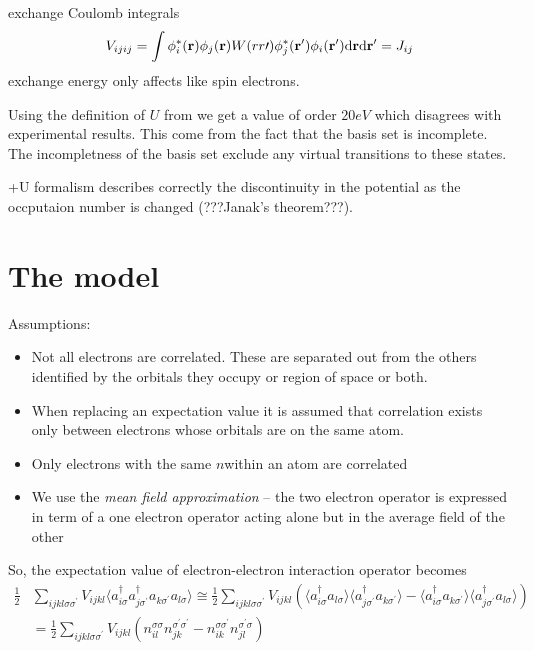 exchange Coulomb integrals
\begin{equation}
V_{ijij}=\int\phi_{i}^{*}({\bf r})\phi_{j}({\bf r})W(rr\prime)\phi_{j}^{*}({\bf r^\prime})\phi_{i}({\bf r^\prime})\text{d}{\bf r}\text{d}{\bf r^\prime}=J_{ij}
\end{equation}
exchange energy only affects like spin electrons.
\par{Using the definition of $U$ from  we get a value of order $20eV$ which 
disagrees with experimental results. This come from the fact that the basis set is incomplete.
The incompletness of the basis set exclude any virtual transitions to these states.}
\par{+U formalism describes correctly the discontinuity in the potential as the occputaion number is changed (???Janak's theorem???).}
\section{The model}
\par{Assumptions:}
\begin{itemize}
\item{Not all electrons are correlated. These are separated out from the others identified by the orbitals they occupy or region of space or both.}
\item{When replacing an expectation value it is assumed that correlation exists only between electrons whose orbitals are on the same atom. }
\item{Only electrons with the same $n$within an atom are correlated}
\item {We use the \textit{mean field approximation} -- the two electron operator is expressed in term of a one electron operator acting alone but in the average field of the other}
\end{itemize}
\par{So, the expectation value of electron-electron interaction operator becomes}
\begin{equation}
\begin{split}
\frac{1}{2}&\sum_{ijkl\sigma\sigma^\prime}V_{ijkl}\langle a_{i\sigma}^{\dag}a_{j\sigma^\prime}^{\dag}a_{k\sigma^\prime}a_{l\sigma}\rangle
\cong \frac{1}{2}\sum_{ijkl\sigma\sigma^\prime}V_{ijkl}(\langle a_{i\sigma}^{\dag}a_{l\sigma} \rangle \langle a_{j\sigma^\prime}^{\dag}a_{k\sigma^\prime} \rangle -
\langle a_{i\sigma}^{\dag}a_{k\sigma^\prime}\rangle \langle a_{j\sigma^\prime}^{\dag}a_{l\sigma} \rangle )\\
&=\frac{1}{2}\sum_{ijkl\sigma\sigma^\prime}V_{ijkl}(n_{il}^{\sigma\sigma}n_{jk}^{\sigma^\prime\sigma^\prime}-
n_{ik}^{\sigma\sigma^\prime}n_{jl}^{\sigma^\prime\sigma})
\end{split}
\end{equation}
